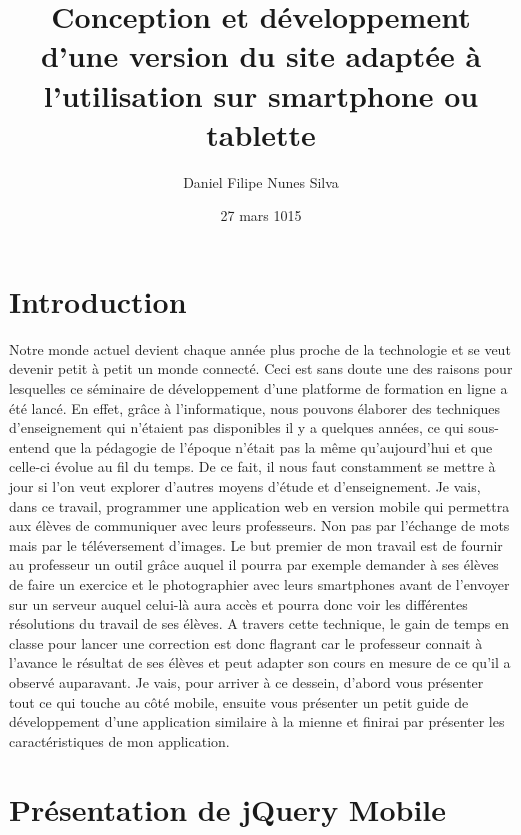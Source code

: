 \documentclass[a4paper,11pt,oneside]{sphinxmanual}
\title{Conception et développement   d’une version du site adaptée à l’utilisation sur smartphone ou tablette}
\date{27 mars 1015}
\author{Daniel Filipe Nunes Silva}
\begin{document}
\maketitle
\tableofcontents
{}\label{index::doc}



\chapter{Introduction}
\label{intro::doc}\label{intro:bienvenue-sur-le-travail-ecrit}\label{intro:introduction}
Notre monde actuel devient chaque année plus proche de la technologie et se veut
devenir petit à petit un monde connecté. Ceci est sans doute une des raisons
pour lesquelles ce séminaire de développement d'une platforme de formation
en ligne a été lancé. En effet, grâce à l'informatique, nous pouvons élaborer
des techniques d'enseignement qui n'étaient pas disponibles il y a quelques
années, ce qui sous-entend que la pédagogie de l'époque n'était pas la même qu'aujourd'hui et que
celle-ci évolue au fil du temps. De ce fait, il nous faut constamment se mettre à jour si l'on
veut explorer d'autres moyens d'étude et d'enseignement. Je vais, dans ce travail,
programmer une application web en version mobile qui permettra aux élèves de
communiquer avec leurs professeurs. Non pas par l'échange de mots mais par le
téléversement d'images. Le but premier de mon travail est de fournir au professeur
un outil grâce auquel il pourra par exemple demander à ses élèves de faire un
exercice et le photographier avec leurs smartphones avant de l'envoyer sur un serveur auquel celui-là
aura accès et pourra donc voir les différentes résolutions du travail de ses élèves.
A travers cette technique, le gain de temps en classe pour lancer une correction
est donc flagrant car le professeur connait à l'avance le résultat de ses élèves
et peut adapter son cours en mesure de ce qu'il a observé auparavant. Je vais, pour arriver à
ce dessein, d'abord vous présenter tout ce qui touche au côté mobile, ensuite
vous présenter un petit guide de développement d'une application similaire à la
mienne et finirai par présenter les caractéristiques de mon application.


\chapter{Présentation de jQuery Mobile}
\label{presentation_jQM::doc}\label{presentation_jQM:presentation-de-jquery-mobile}
\end{document}
